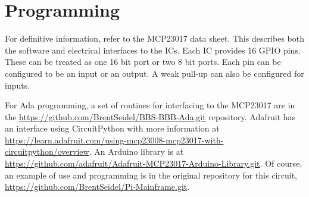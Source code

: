 \documentclass[10pt, openany]{book}
\begin{document}
\chapter{Programming}
For definitive information, refer to the MCP23017 data sheet.  This describes both the software and electrical interfaces to the ICs.  Each IC provides 16 GPIO pins.  These can be treated as one 16 bit port or two 8 bit ports.  Each pin can be configured to be an input or an output.  A weak pull-up can also be configured for inputs.

For Ada programming, a set of routines for interfacing to the MCP23017 are in the \url{https://github.com/BrentSeidel/BBS-BBB-Ada.git} repository.  Adafruit has an interface using CircuitPython with more information at \url{https://learn.adafruit.com/using-mcp23008-mcp23017-with-circuitpython/overview}.  An Arduino library is at \url{https://github.com/adafruit/Adafruit-MCP23017-Arduino-Library.git}.  Of course, an example of use and programming is in the original repository for this circuit, \url{https://github.com/BrentSeidel/Pi-Mainframe.git}.
\end{document}
